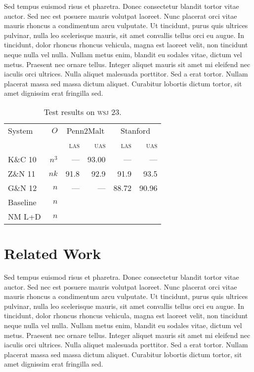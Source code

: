 \documentclass[11pt,letterpaper]{article}
\newcommand{\las}{\textsc{las}\xspace}
\newcommand{\uas}{\textsc{uas}\xspace}
\newcommand{\wsj}{\textsc{wsj}\xspace}
\begin{document}
Sed tempus euismod risus et pharetra. Donec consectetur blandit tortor vitae auctor. Sed nec est posuere mauris volutpat laoreet. Nunc placerat orci vitae mauris rhoncus a condimentum arcu vulputate. Ut tincidunt, purus quis ultrices pulvinar, nulla leo scelerisque mauris, sit amet convallis tellus orci eu augue. In tincidunt, dolor rhoncus rhoncus vehicula, magna est laoreet velit, non tincidunt neque nulla vel nulla. Nullam metus enim, blandit eu sodales vitae, dictum vel metus. Praesent nec ornare tellus. Integer aliquet mauris sit amet mi eleifend nec iaculis orci ultrices. Nulla aliquet malesuada porttitor. Sed a erat tortor. Nullam placerat massa sed massa dictum aliquet. Curabitur lobortis dictum tortor, sit amet dignissim erat fringilla sed.


\begin{table}
    \centering
    \small
    \begin{tabular}{l|r|rr|rr}
        \hline 
System  &   $O$      & \multicolumn{2}{c|}{Penn2Malt} & \multicolumn{2}{c}{Stanford} \\
                           &          & \las  & \uas  & \las & \uas \\
        \hline \hline
K\&C 10  & $n^3$ & ---   & 93.00 & ---  & --- \\
Z\&N 11  & $nk$  & 91.8  & 92.9  & 91.9 & 93.5\\
G\&N 12  & $n$   & ---   & ---   & 88.72 & 90.96 \\
        \hline
Baseline    & $n$ &       &       &       &  \\
NM L+D & $n$ &       &       &       &  \\
\hline
    \end{tabular}
    \caption{Test results on \wsj 23. 
         \label{tab:feats}}
\end{table}



\section{Related Work}


Sed tempus euismod risus et pharetra. Donec consectetur blandit tortor vitae auctor. Sed nec est posuere mauris volutpat laoreet. Nunc placerat orci vitae mauris rhoncus a condimentum arcu vulputate. Ut tincidunt, purus quis ultrices pulvinar, nulla leo scelerisque mauris, sit amet convallis tellus orci eu augue. In tincidunt, dolor rhoncus rhoncus vehicula, magna est laoreet velit, non tincidunt neque nulla vel nulla. Nullam metus enim, blandit eu sodales vitae, dictum vel metus. Praesent nec ornare tellus. Integer aliquet mauris sit amet mi eleifend nec iaculis orci ultrices. Nulla aliquet malesuada porttitor. Sed a erat tortor. Nullam placerat massa sed massa dictum aliquet. Curabitur lobortis dictum tortor, sit amet dignissim erat fringilla sed.
\end{document}
